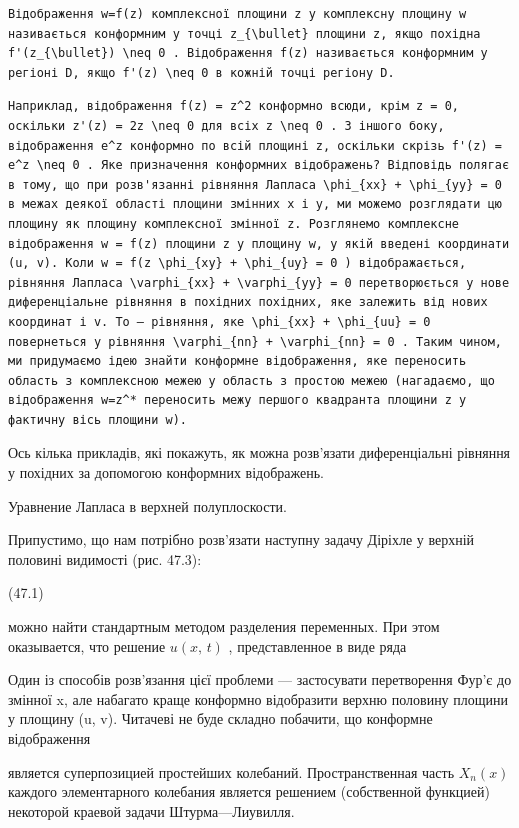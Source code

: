 \documentclass[
  ukrainian,
]{article}
\begin{document}
\begin{verbatim}
Відображення w=f(z) комплексної площини z у комплексну площину w називається конформним у точці z_{\bullet} площини z, якщо похідна f'(z_{\bullet}) \neq 0 . Відображення f(z) називається конформним у регіоні D, якщо f'(z) \neq 0 в кожній точці регіону D.
\end{verbatim}

\begin{verbatim}
Наприклад, відображення f(z) = z^2 конформно всюди, крім z = 0, оскільки z'(z) = 2z \neq 0 для всіх z \neq 0 . З іншого боку, відображення e^z конформно по всій площині z, оскільки скрізь f'(z) = e^z \neq 0 . Яке призначення конформних відображень? Відповідь полягає в тому, що при розв'язанні рівняння Лапласа \phi_{xx} + \phi_{yy} = 0 в межах деякої області площини змінних x і y, ми можемо розглядати цю площину як площину комплексної змінної z. Розглянемо комплексне відображення w = f(z) площини z у площину w, у якій введені координати (u, v). Коли w = f(z \phi_{xy} + \phi_{uy} = 0 ) відображається, рівняння Лапласа \varphi_{xx} + \varphi_{yy} = 0 перетворюється у нове диференціальне рівняння в похідних похідних, яке залежить від нових координат і v. To — рівняння, яке \phi_{xx} + \phi_{uu} = 0 повернеться у рівняння \varphi_{nn} + \varphi_{nn} = 0 . Таким чином, ми придумаємо ідею знайти конформне відображення, яке переносить область з комплексною межею у область з простою межею (нагадаємо, що відображення w=z^* переносить межу першого квадранта площини z у фактичну вісь площини w).
\end{verbatim}

Ось кілька прикладів, які покажуть, як можна розв'язати диференціальні
рівняння у похідних за допомогою конформних відображень.

Уравнение Лапласа в верхней полуплоскости.

Припустимо, що нам потрібно розв'язати наступну задачу Діріхле у верхній
половині видимості (рис. 47.3):

(47.1)

можно найти стандартным методом разделения переменных. При этом
оказывается, что решение \(u\left(x,\,t\right)\) , представленное в виде
ряда

Один із способів розв'язання цієї проблеми --- застосувати перетворення
Фур'є до змінної x, але набагато краще конформно відобразити верхню
половину площини у площину (u, v). Читачеві не буде складно побачити, що
конформне відображення

является суперпозицией простейших колебаний. Пространственная часть
\(X_n(x)\) каждого элементарного колебания является решением
(собственной функцией) некоторой краевой задачи Штурма---Лиувилля.
\end{document}
